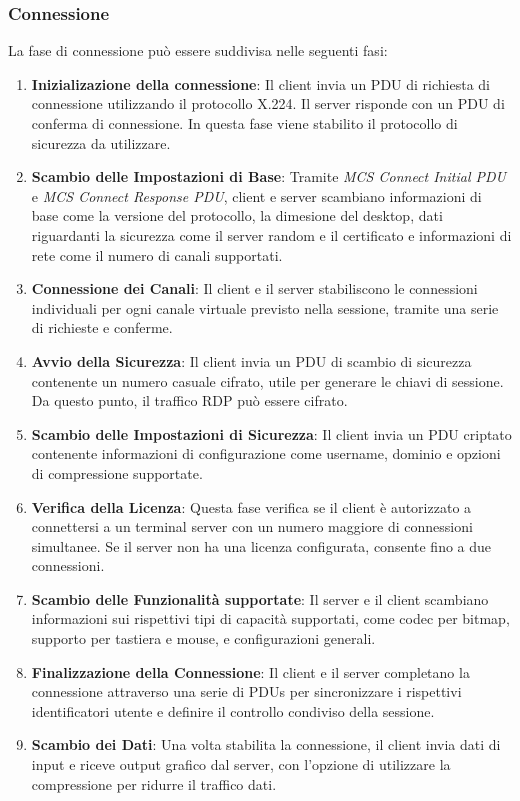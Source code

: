 \documentclass[12pt,a4paper,openright,twoside]{book}
\begin{document}
\subsubsection{Connessione}
La fase di connessione può essere suddivisa nelle seguenti fasi:
\begin{enumerate}
    \item \textbf{Inizializazione della connessione}: Il client invia un \ac{PDU} di richiesta di connessione utilizzando il protocollo X.224. Il server risponde con un \ac{PDU} di conferma di connessione.
    In questa fase viene stabilito il protocollo di sicurezza da utilizzare.
    \item \textbf{Scambio delle Impostazioni di Base}: Tramite \emph{MCS Connect Initial \ac{PDU}} e \emph{MCS Connect Response \ac{PDU}},
    client e server scambiano informazioni di base come la versione del protocollo, la dimesione del desktop,
    dati riguardanti la sicurezza come il server random e il certificato e informazioni di rete come il numero di canali supportati.
    \item \textbf{Connessione dei Canali}: Il client e il server stabiliscono le connessioni individuali per ogni canale virtuale previsto nella sessione,
    tramite una serie di richieste e conferme.
    \item \textbf{Avvio della Sicurezza}: Il client invia un \ac{PDU} di scambio di sicurezza contenente un numero casuale cifrato, utile per generare le chiavi di sessione.
    Da questo punto, il traffico \ac{RDP} può essere cifrato.
    \item \textbf{Scambio delle Impostazioni di Sicurezza}: Il client invia un \ac{PDU} criptato contenente informazioni di configurazione come username,
    dominio e opzioni di compressione supportate.
    \item \textbf{Verifica della Licenza}: Questa fase verifica se il client è autorizzato a connettersi a un terminal server con un numero maggiore di connessioni simultanee.
    Se il server non ha una licenza configurata, consente fino a due connessioni.
    \item \textbf{Scambio delle Funzionalità supportate}: Il server e il client scambiano informazioni sui rispettivi tipi di capacità supportati, come codec per bitmap,
    supporto per tastiera e mouse, e configurazioni generali.
    \item \textbf{Finalizzazione della Connessione}: Il client e il server completano la connessione attraverso una serie di \ac{PDU}s per sincronizzare i rispettivi identificatori utente e definire il controllo condiviso della sessione.
    \item \textbf{Scambio dei Dati}: Una volta stabilita la connessione, il client invia dati di input e riceve output grafico dal server,
    con l’opzione di utilizzare la compressione per ridurre il traffico dati.
\end{enumerate}
\end{document}
